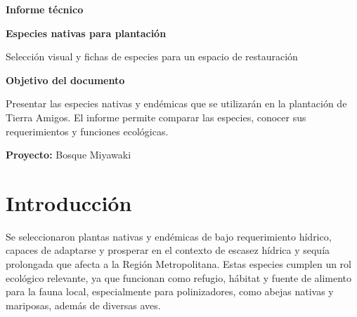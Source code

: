\documentclass[11pt,a4paper]{article}
\begin{document}
\hypersetup{pageanchor=false}
\begin{titlepage}

    \vspace*{2.2cm}
    {\color{black}\large\bfseries Informe técnico}\par
    \vspace{0.8cm}
    {\color{black}\Huge\bfseries Especies nativas para plantación}\par
    \vspace{0.8cm}
    {\color{black}\Large Selección visual y fichas de especies para un espacio de restauración}\par

    \vspace{2.5cm}
    \begin{tcolorbox}[
        width=0.72\textwidth,
        colback=white,
        colframe=ForestGreen,
        arc=3mm,
        boxrule=0.9pt,
        left=4mm,
        right=4mm,
        top=3mm,
        bottom=3mm
    ]
    \textbf{Objetivo del documento}\par
    Presentar las especies nativas y endémicas que se utilizarán en la plantación de Tierra Amigos. El informe permite comparar las especies, conocer sus requerimientos y funciones ecológicas.
    \end{tcolorbox}

    \vfill
    {\color{white}\large\textbf{Proyecto:} Bosque Miyawaki}\par
\end{titlepage}
\hypersetup{pageanchor=true}

\tableofcontents
\newpage

\section{Introducción}
Se seleccionaron plantas nativas y endémicas de bajo requerimiento hídrico, capaces de adaptarse y prosperar en el contexto de escasez hídrica y sequía prolongada que afecta a la Región Metropolitana. Estas especies cumplen un rol ecológico relevante, ya que funcionan como refugio, hábitat y fuente de alimento para la fauna local, especialmente para polinizadores, como abejas nativas y mariposas, además de diversas aves.
\end{document}
